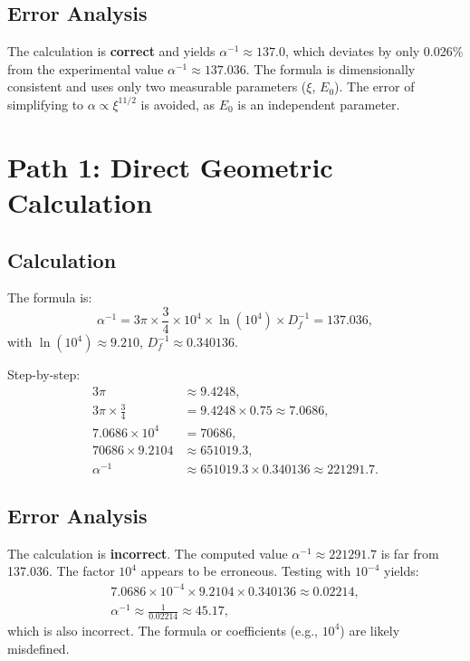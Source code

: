 \documentclass[12pt,a4paper]{article}
\theoremstyle{definition}
\begin{document}
	\subsection{Error Analysis}
	\begin{tcolorbox}[colback=green!5!white,colframe=deepgreen,title=Correctness]
		The calculation is \textbf{correct} and yields \(\alpha^{-1} \approx 137.0\), which deviates by only 0.026\% from the experimental value \(\alpha^{-1} \approx 137.036\). The formula is dimensionally consistent and uses only two measurable parameters (\(\xi\), \(E_0\)). The error of simplifying to \(\alpha \propto \xi^{11/2}\) is avoided, as \(E_0\) is an independent parameter.
	\end{tcolorbox}
	
	\section{Path 1: Direct Geometric Calculation}
	\subsection{Calculation}
	The formula is:
	\begin{equation}
		\alpha^{-1} = 3\pi \times \frac{3}{4} \times 10^4 \times \ln(10^4) \times D_f^{-1} = 137.036,
	\end{equation}
	with \(\ln(10^4) \approx 9.210\), \(D_f^{-1} \approx 0.340136\).
	
	Step-by-step:
	\begin{align}
		3\pi &\approx 9.4248, \\
		3\pi \times \frac{3}{4} &= 9.4248 \times 0.75 \approx 7.0686, \\
		7.0686 \times 10^4 &= 70686, \\
		70686 \times 9.2104 &\approx 651019.3, \\
		\alpha^{-1} &\approx 651019.3 \times 0.340136 \approx 221291.7.
	\end{align}
	
	\subsection{Error Analysis}
	\begin{tcolorbox}[colback=red!5!white,colframe=deepred,title=Error]
		The calculation is \textbf{incorrect}. The computed value \(\alpha^{-1} \approx 221291.7\) is far from 137.036. The factor \(10^4\) appears to be erroneous. Testing with \(10^{-4}\) yields:
		\begin{align*}
			7.0686 \times 10^{-4} \times 9.2104 \times 0.340136 \approx 0.02214, \\
			\alpha^{-1} \approx \frac{1}{0.02214} \approx 45.17,
		\end{align*}
		which is also incorrect. The formula or coefficients (e.g., \(10^4\)) are likely misdefined.
	\end{tcolorbox}
	
\end{document}
